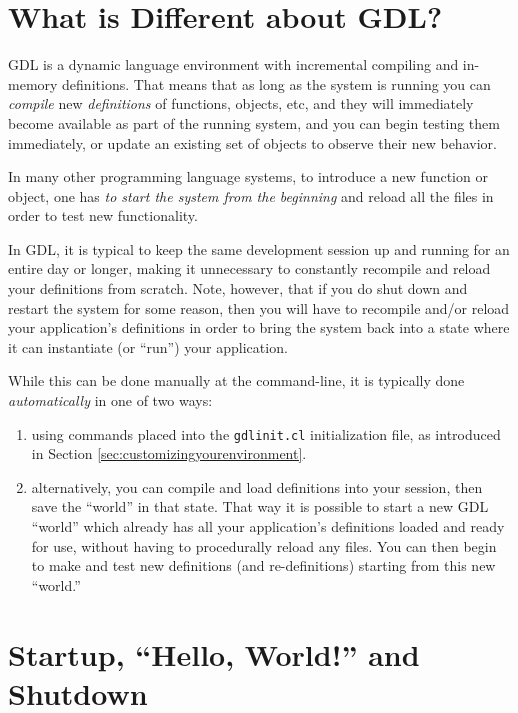 \documentclass [11pt]{book}
\begin{document}
\section{What is Different about GDL?}

\label{sec:whatisdifferentaboutgdl?}

GDL is a dynamic language environment with incremental
compiling and in-memory definitions. That means that as long as the
system is running you can \emph{compile} new \emph{definitions} of functions, objects, etc, and they will immediately become
available as part of the running system, and you can begin testing
them immediately, or update an existing set of objects to observe
their new behavior.

In many other programming language systems, to introduce a new
function or object, one has \emph{to start the system from the beginning} and reload all the files in order to test new functionality.
 
In GDL, it is typical to keep the same development session up and
running for an entire day or longer, making it unnecessary to
constantly recompile and reload your definitions from scratch. Note,
however, that if you do shut down and restart the system for some
reason, then you will have to recompile and/or reload your
application's definitions in order to bring the system back into a
state where it can instantiate (or ``run'') your application.

While this can be done manually at the command-line, it is typically
done \emph{automatically} in one of two ways:

\begin{enumerate}

\item using commands placed into
the \texttt{gdlinit.cl} initialization file, as introduced in Section 
\ref{sec:customizingyourenvironment}.

\item alternatively, you can compile and load definitions into
your session, then save the ``world'' in that state. That way it is
possible to start a new GDL ``world'' which already has all your
application's definitions loaded and ready for use, without having to
procedurally reload any files. You can then begin to make and test new
definitions (and re-definitions) starting from this new ``world.''

\end{enumerate}



\section{Startup, ``Hello, World!'' and Shutdown}
\end{document}

